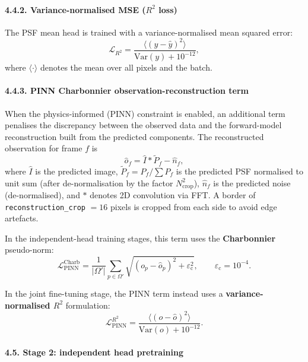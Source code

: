 \documentclass{aa}
\begin{document}
\paragraph{4.4.2. Variance-normalised MSE ($R^2$ loss)}

The PSF mean head is trained with a variance-normalised mean squared error:
\begin{equation}
\mathcal{L}_{R^2} =
\frac{\langle (y - \hat{y})^2 \rangle}{\mathrm{Var}(y) + 10^{-12}},
\end{equation}
where $\langle \cdot \rangle$ denotes the mean over all pixels and the batch.

\paragraph{4.4.3. PINN Charbonnier observation-reconstruction term}

When the physics-informed (PINN) constraint is enabled, an additional term penalises the discrepancy between the observed data and the forward-model reconstruction built from the predicted components. The reconstructed observation for frame $f$ is
\begin{equation}
\hat{o}_f = \hat{I} \ast \tilde{P}_f - \hat{n}_f,
\end{equation}
where $\hat{I}$ is the predicted image, $\tilde{P}_f = P_f / \sum P_f$ is the predicted PSF normalised to unit sum (after de-normalisation by the factor $N_\mathrm{crop}^2$), $\hat{n}_f$ is the predicted noise (de-normalised), and $\ast$ denotes 2D convolution via FFT. A border of \texttt{reconstruction\_crop} $= 16$ pixels is cropped from each side to avoid edge artefacts.

In the independent-head training stages, this term uses the \textbf{Charbonnier} pseudo-norm:
\begin{equation}
\mathcal{L}_{\mathrm{PINN}}^{\mathrm{Charb}}
=
\frac{1}{|\Omega'|} \sum_{p \in \Omega'}
\sqrt{(o_p - \hat{o}_p)^2 + \varepsilon_{\mathrm{c}}^2},
\qquad
\varepsilon_{\mathrm{c}} = 10^{-4}.
\end{equation}

In the joint fine-tuning stage, the PINN term instead uses a \textbf{variance-normalised $R^2$} formulation:
\begin{equation}
\mathcal{L}_{\mathrm{PINN}}^{R^2}
=
\frac{\langle (o - \hat{o})^2 \rangle}{\mathrm{Var}(o) + 10^{-12}}.
\end{equation}

\paragraph{4.5. Stage 2: independent head pretraining}
\end{document}
